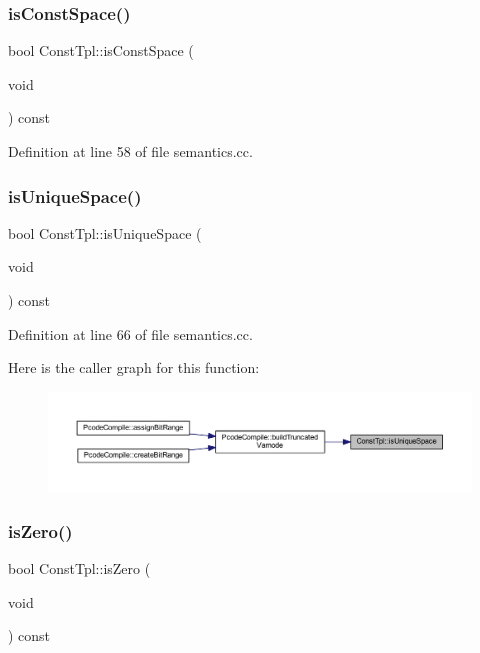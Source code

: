 \subsubsection{\texorpdfstring{isConstSpace()}{isConstSpace()}}
{\footnotesize\ttfamily bool Const\+Tpl\+::is\+Const\+Space (\begin{DoxyParamCaption}\item[{void}]{ }\end{DoxyParamCaption}) const}



Definition at line 58 of file semantics.\+cc.

\mbox{\label{class_const_tpl_a9626ee452f63e079a22ab5662e92cd6d}} 
\subsubsection{\texorpdfstring{isUniqueSpace()}{isUniqueSpace()}}
{\footnotesize\ttfamily bool Const\+Tpl\+::is\+Unique\+Space (\begin{DoxyParamCaption}\item[{void}]{ }\end{DoxyParamCaption}) const}



Definition at line 66 of file semantics.\+cc.

Here is the caller graph for this function\+:
\nopagebreak
\begin{figure}[H]
\begin{center}
\leavevmode
\includegraphics[width=350pt]{class_const_tpl_a9626ee452f63e079a22ab5662e92cd6d_icgraph}
\end{center}
\end{figure}
\mbox{\label{class_const_tpl_a544ad1f2c43673e6975da4872003626f}} 
\subsubsection{\texorpdfstring{isZero()}{isZero()}}
{\footnotesize\ttfamily bool Const\+Tpl\+::is\+Zero (\begin{DoxyParamCaption}\item[{void}]{ }\end{DoxyParamCaption}) const\hspace{0.3cm}{\ttfamily [inline]}}




